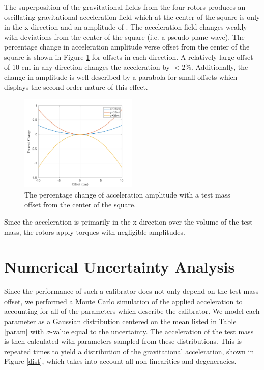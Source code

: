 \documentclass[superscriptaddress, twocolumn, prd]{revtex4-1}
\begin{document}
The superposition of the gravitational fields from the four rotors produces an oscillating gravitational acceleration field which at the center of the square is only in the x-direction and an amplitude of . The acceleration field changes weakly with deviations from the center of the square (i.e. a pseudo plane-wave). The percentage change in acceleration amplitude verse offset from the center of the square is shown in Figure \ref{offset} for offsets in each direction. A relatively large offset of 10 cm in any direction changes the acceleration by $<2\%$. Additionally, the change in amplitude is well-described by a parabola for small offsets which displays the second-order nature of this effect. 


\begin{figure}[!h]
\centering \includegraphics[width=0.5\textwidth]{Super4_Offset.pdf}
\caption{The percentage change of acceleration amplitude with a test mass offset from the center of the square.}
\label{offset} 
\end{figure}

Since the acceleration is primarily in the x-direction over the volume of the test mass, the rotors apply torques with negligible amplitudes.

\section{Numerical Uncertainty Analysis}

Since the performance of such a calibrator does not only depend on the test mass offset, we performed a Monte Carlo simulation of the applied acceleration to accounting for all of the parameters which describe the calibrator. We model each parameter as a Gaussian distribution centered on the mean listed in Table \ref{param} with $\sigma$-value equal to the uncertainty. The acceleration of the test mass is then calculated with parameters sampled from these distributions. This is repeated  times to yield a distribution of the gravitational acceleration, shown in Figure \ref{dist}, which takes into account all non-linearities and degeneracies. 
\end{document}
